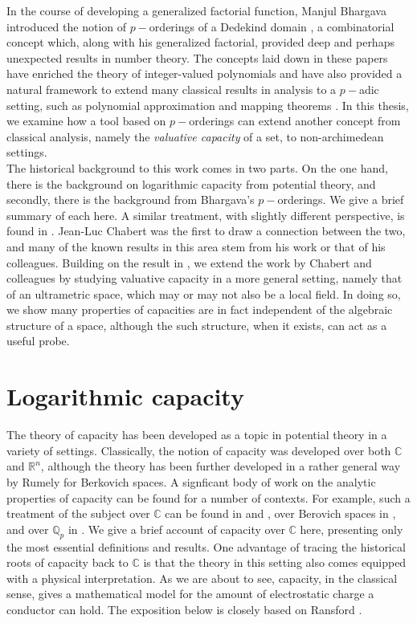 
In the course of developing a generalized factorial function, Manjul Bhargava introduced the notion of $p-$orderings of a Dedekind domain \cite{mb1, mb2}, a combinatorial concept which, along with his generalized factorial, provided deep and perhaps unexpected results in number theory. The concepts laid down in these papers have enriched the theory of integer-valued polynomials \cite{mb3, kj2} and have also provided a natural framework to extend many classical results in analysis to a $p-$adic setting, such as polynomial approximation and mapping theorems \cite{mb1, mb2,mb3}. In this thesis, we examine how a tool based on $p-$orderings can extend another concept from classical analysis, namely the \textit{valuative capacity} of a set, to non-archimedean settings.\\

The historical background to this work comes in two parts. On the one hand, there is the background on logarithmic capacity from potential theory, and secondly, there is the background from Bhargava's $p-$orderings. We give a brief summary of each here. A similar treatment, with slightly different perspective, is found in \cite{fp}. Jean-Luc Chabert was the first to draw a connection between the two, and many of the known results in this area stem from his work or that of his colleagues. Building on the result in \cite{kj}, we extend the work by Chabert and colleagues by studying valuative capacity in a more general setting, namely that of an ultrametric space, which may or may not also be a local field. In doing so, we show many properties of capacities are in fact independent of the algebraic structure of a space, although the such structure, when it exists, can act as a useful probe.\\

\section{Logarithmic capacity}
The theory of capacity has been developed as a topic in potential theory in a variety of settings. Classically, the notion of capacity was developed over both $\mathbb{C}$ and $\mathbb{R}^n$, although the theory has been further developed in a rather general way by Rumely for Berkovich spaces. A  signficant body of work on the analytic properties of capacity can be found for a number of contexts. For example, such a treatment of the subject over $\mathbb{C}$ can be found in \cite{wer} and \cite{rand}, over Berovich spaces in \cite{rum}, and over $\mathbb{Q}_p$ in \cite{dgc}. We give a brief account of capacity over $\mathbb{C}$ here, presenting only the most essential definitions and results.   One advantage of tracing the historical roots of capacity back to $\mathbb{C}$ is that the theory in this setting also comes equipped with a physical interpretation. As we are about to see, capacity, in the classical sense, gives a mathematical model for the amount of electrostatic charge a conductor can hold. The exposition below is closely based on Ransford \cite{rand}.\\

